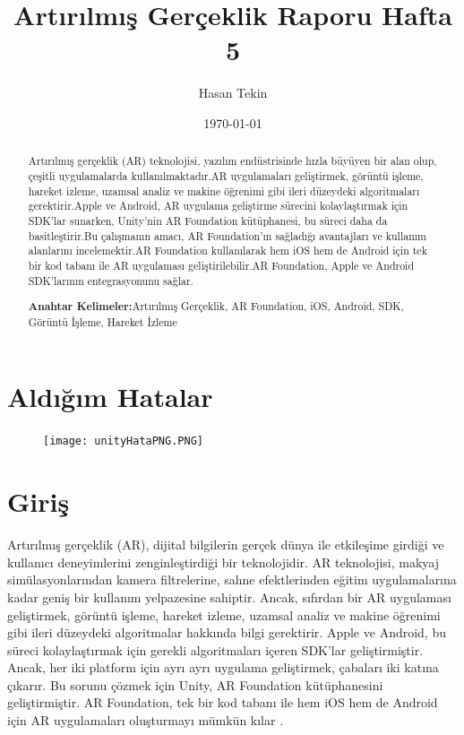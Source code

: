 \documentclass[12pt, a4paper]{article}
\begin{document}
	\section{Aldığım Hatalar}
	\begin{figure}[!ht]
		\caption{}
		\centering
		\texttt{[image: unityHataPNG.PNG]}
		
		\label{Hata}
		
	\end{figure}
	
	\newpage
	
	\title{Artırılmış Gerçeklik Raporu Hafta 5}
	\author{Hasan Tekin}
	\date{\today}
	\maketitle
	\setcounter{section}{0}
		\begin{abstract}
		\begin{justify}
			Artırılmış gerçeklik (AR) teknolojisi, yazılım endüstrisinde hızla büyüyen bir alan olup, çeşitli uygulamalarda kullanılmaktadır.AR uygulamaları geliştirmek, görüntü işleme, hareket izleme, uzamsal analiz ve makine öğrenimi gibi ileri düzeydeki algoritmaları gerektirir.Apple ve Android, AR uygulama geliştirme sürecini kolaylaştırmak için SDK'lar sunarken, Unity'nin AR Foundation kütüphanesi, bu süreci daha da basitleştirir.Bu çalışmanın amacı, AR Foundation'ın sağladığı avantajları ve kullanım alanlarını incelemektir.AR Foundation kullanılarak hem iOS hem de Android için tek bir kod tabanı ile AR uygulaması geliştirilebilir.AR Foundation, Apple ve Android SDK'larının entegrasyonunu sağlar.      
		\end{justify}
		\textbf{Anahtar Kelimeler:}Artırılmış Gerçeklik, AR Foundation, iOS, Android, SDK, Görüntü İşleme, Hareket İzleme
		
	\end{abstract}
	\section{Giriş}
	
	Artırılmış gerçeklik (AR), dijital bilgilerin gerçek dünya ile etkileşime girdiği ve kullanıcı deneyimlerini zenginleştirdiği bir teknolojidir. AR teknolojisi, makyaj simülasyonlarından kamera filtrelerine, sahne efektlerinden eğitim uygulamalarına kadar geniş bir kullanım yelpazesine sahiptir. Ancak, sıfırdan bir AR uygulaması geliştirmek, görüntü işleme, hareket izleme, uzamsal analiz ve makine öğrenimi gibi ileri düzeydeki algoritmalar hakkında bilgi gerektirir. Apple ve Android, bu süreci kolaylaştırmak için gerekli algoritmaları içeren SDK'lar geliştirmiştir. Ancak, her iki platform için ayrı ayrı uygulama geliştirmek, çabaları iki katına çıkarır. Bu sorunu çözmek için Unity, AR Foundation kütüphanesini geliştirmiştir. AR Foundation, tek bir kod tabanı ile hem iOS hem de Android için AR uygulamaları oluşturmayı mümkün kılar \cite{ARFoundation}.
\end{document}
